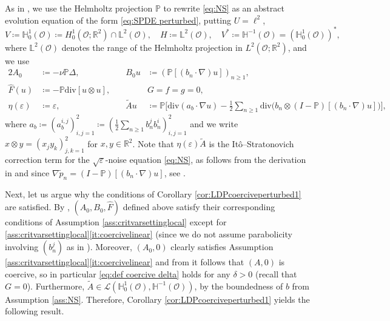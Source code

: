\documentclass{amsart}
\newcommand{\<}{\langle}
\newcommand{\?}{\rangle}
\newcommand{\ceqq}{\coloneqq}
\renewcommand{\O}{\mathcal{O}}
\newcommand{\pr}{\mathbb{P}}
\newcommand{\Ls}{\mathbb{L}}
\newcommand{\Hs}{\mathbb{H}}
\renewcommand{\div}{\mathrm{div}}
\theoremstyle{plain}
\theoremstyle{remark}
\theoremstyle{plain}
\numberwithin{equation}{section}
\def\R{{\mathbb R}}
\renewcommand{\P}{\mathbb{P}}
\newcommand{\eps}{\varepsilon}
\begin{document}
As in \cite[\S 7.3.4]{AV25survey}, we use the Helmholtz projection $\P$  to rewrite \eqref{eq:NS} as an abstract evolution equation of the form \eqref{eq:SPDE perturbed}, putting $U = \ell^2$,  
\[
V \ceqq \Hs^1_0(\O) \ceqq H^1_0(\O;\R^2)\cap \Ls^2(\O),\quad H \ceqq \Ls^2(\O), \quad V^* \ceqq \Hs^{-1}(\O) = (\Hs^1_0(\O))^*,
\]
where $\Ls^2(\O)$ denotes the range of the Helmholtz projection in $L^2(\O;\R^2)$, 
and we use 
\begin{alignat*}{2}
A_0 &\ceqq -\nu \pr\Delta, &\quad   
B_0 u &\ceqq (\pr[(b_{n}\cdot\nabla) u])_{n\geq 1}, \\
\hat{F}(u) &\ceqq- \pr\div[u\otimes u],   &\quad
&G=\hat{f}=g=0,\\
\eta(\eps)&\ceqq \eps,  &\quad
\tilde{A}u&\ceqq 
\P\big[\div(a_b\cdot\nabla u)-\tfrac12\textstyle{\sum_{n\geq 1}}\div\big(b_n\otimes(I-\pr)[(b_n\cdot\nabla)u]\big)\big],
\end{alignat*} 
where  $a_b\ceqq (a_b^{i,j})_{i,j=1}^2\ceqq (\frac12\sum_{n\geq 1}b_n^jb_n^i)_{i,j=1}^2$ and we write $x\otimes y=(x_jy_k)_{j,k=1}^2$ for $x,y\in\R^2$.  
Note that  $\eta(\eps)\tilde{A}$ is the It\^o--Stratonovich correction term for the $\sqrt{\eps}$-noise equation \eqref{eq:NS}, as follows from the derivation in \cite[(1.4), Rem.\ 2.2]{AV24SNS} and since 
$\nabla\widetilde{p}_n=(I-\pr)[(b_n\cdot\nabla)u]$, see \cite[p.\ 43]{AV24SNS}.  


Next, let us argue why the conditions of Corollary \ref{cor:LDPcoerciveperturbed1} are satisfied.  By \cite[\S7.3.4]{AV25survey}, $(A_0,B_0,\hat{F})$ defined above satisfy their corresponding conditions of Assumption \ref{ass:critvarsettinglocal} except for \ref{ass:critvarsettinglocal}\ref{it:coercivelinear} (since we do not assume parabolicity involving $(b_n^j)$ as in \cite[Asm.\ 7.13]{AV25survey}). 
Moreover, $(A_0,0)$ clearly satisfies Assumption \ref{ass:critvarsettinglocal}\ref{it:coercivelinear} and from \cite[\S7.3.4]{AV25survey} it follows that $(A,0)$ is coercive, so in particular    \eqref{eq:def coercive delta} holds for any $\delta>0$ (recall that $G=0$).  
Furthermore, $\tilde{A}\in\mathscr{L}(\Hs_0^1(\O),\Hs^{-1}(\O))$, by the boundedness of $b$ from Assumption \ref{ass:NS}. 
Therefore, Corollary \ref{cor:LDPcoerciveperturbed1} yields the following result.
\end{document}
